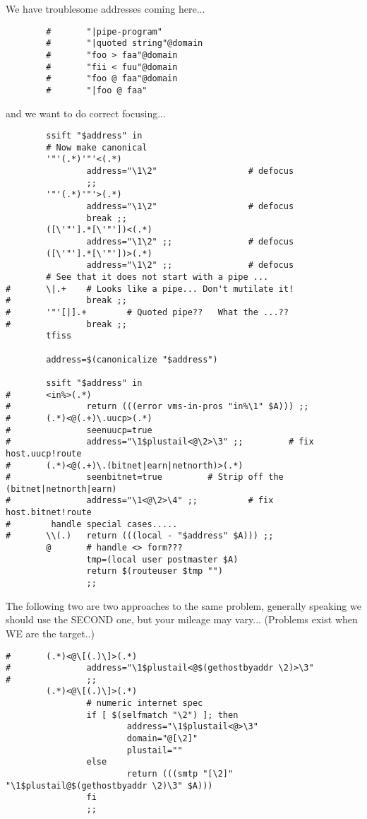 We have troublesome addresses coming here...
\begin{verbatim}
        #       "|pipe-program"
        #       "|quoted string"@domain
        #       "foo > faa"@domain
        #       "fii < fuu"@domain
        #       "foo @ faa"@domain
        #       "|foo @ faa"
\end{verbatim}
and we want to do correct focusing...
\begin{verbatim}
        ssift "$address" in
        # Now make canonical
        '"'(.*)'"'<(.*)
                address="\1\2"                  # defocus
                ;;
        '"'(.*)'"'>(.*)
                address="\1\2"                  # defocus
                break ;;
        ([\'"'].*[\'"'])<(.*)
                address="\1\2" ;;               # defocus
        ([\'"'].*[\'"'])>(.*)
                address="\1\2" ;;               # defocus
        # See that it does not start with a pipe ...
#       \|.+    # Looks like a pipe... Don't mutilate it!
#               break ;;
#       '"'[|].+        # Quoted pipe??   What the ...??
#               break ;;
        tfiss

        address=$(canonicalize "$address")

        ssift "$address" in
#       <in%>(.*)
#               return (((error vms-in-pros "in%\1" $A))) ;;
#       (.*)<@(.+)\.uucp>(.*)
#               seenuucp=true
#               address="\1$plustail<@\2>\3" ;;         # fix host.uucp!route
#       (.*)<@(.+)\.(bitnet|earn|netnorth)>(.*)
#               seenbitnet=true         # Strip off the (bitnet|netnorth|earn)
#               address="\1<@\2>\4" ;;          # fix host.bitnet!route
#        handle special cases.....
#       \\(.)   return (((local - "$address" $A))) ;;
        @       # handle <> form???
                tmp=(local user postmaster $A)
                return $(routeuser $tmp "")
                ;;
\end{verbatim}


The following two are two approaches to the same problem, generally
speaking we should use the SECOND one, but your mileage may vary...
(Problems exist when WE are the target..)

\begin{verbatim}
#       (.*)<@\[(.)\]>(.*)
#               address="\1$plustail<@$(gethostbyaddr \2)>\3"
#               ;;
        (.*)<@\[(.)\]>(.*)
                # numeric internet spec
                if [ $(selfmatch "\2") ]; then
                        address="\1$plustail<@>\3"
                        domain="@[\2]"
                        plustail=""
                else
                        return (((smtp "[\2]" "\1$plustail@$(gethostbyaddr \2)\3" $A)))
                fi
                ;;
\end{verbatim}


